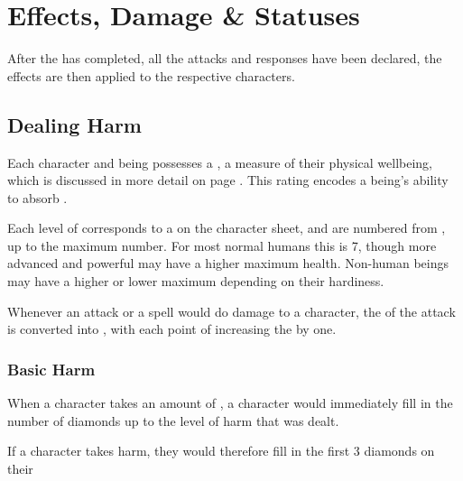 \chapter{Effects, Damage \& Statuses}


After the  has completed, all the attacks and responses have been declared, the effects are then applied to the respective characters. 



\section{Dealing Harm}

Each character and being possesses a , a measure of their physical wellbeing, which is discussed in more detail on page \pageref{S:Health}. This  rating encodes a being's ability to absorb .

Each level of  corresponds to a  on the character sheet, and are numbered from , up to the maximum number. For most normal humans this is 7, though more advanced and powerful may have a higher maximum health. Non-human beings may have a higher or lower maximum  depending on their hardiness. 

Whenever an attack or a spell would do damage to a character, the  of the attack is converted into , with each point of  increasing the  by one.  

\subsection{Basic Harm}

When a character takes an amount of , a character would immediately fill in the number of diamonds up to the level of harm that was dealt. 

If a character takes  harm, they would therefore fill in the first 3 diamonds on their 

\newcommand\df[1]
{
	\begin{tikzpicture}
		\def\r{0.1}
		\def\theta{45}
		\def\dfill{white}
		\if#15
			\def\dfill{black}
		\fi
		\draw[rotate =\theta,fill = \dfill] ({-\r},{-\r}) rectangle ({\r},{\r});
		
		\ifnum#1>0
			\draw[rotate =\theta,fill = \dfill] ({-\r},{-\r}) -- ({\r},{\r});
			
			\ifnum#1>1
				
				\draw[rotate =\theta,fill = \dfill] ({-\r},{\r}) -- ({\r},{-\r});
				\ifnum#1>2
					
					\draw[rotate =\theta,fill = \dfill] ({-\r},{0}) -- ({\r},{0});
					
					\ifnum#1>3
						
						\draw[rotate =\theta] ({0},{-\r}) -- ({0},{\r});
					\fi
					
				\fi
			\fi
		\fi
		
	\end{tikzpicture}
}

